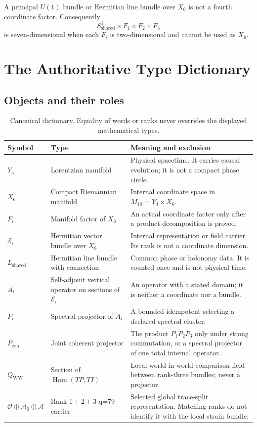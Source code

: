 \documentclass[11pt]{article}
\newcommand{\Ebundle}{\mathcal E}
\newcommand{\Lshared}{L_{\mathrm{shared}}}
\newcommand{\Pcoh}{P_{\mathrm{coh}}}
\newcommand{\Atrace}{\mathcal A_0}
\newcommand{\Acover}{\mathcal A}
\newcommand{\WW}{Q_{\mathrm{WW}}}
\newcommand{\Hom}{\operatorname{Hom}}
\begin{document}
A principal $U(1)$ bundle or Hermitian line bundle over $X_6$ is not a fourth
coordinate factor.  Consequently
\[
 S^1_{\mathrm{shared}}\times F_1\times F_2\times F_3
\]
is seven-dimensional when each $F_i$ is two-dimensional and cannot be used
as $X_6$.

\section{The Authoritative Type Dictionary}

\subsection{Objects and their roles}

\begin{table}[ht]
\centering
\small
\renewcommand{\arraystretch}{1.22}
\begin{tabularx}{\textwidth}{@{}P{0.15\textwidth}P{0.28\textwidth}Y@{}}
\hline
Symbol & Type & Meaning and exclusion \\
\hline
$Y_4$ &
Lorentzian manifold &
Physical spacetime.  It carries causal evolution; it is not a compact phase
circle. \\
$X_6$ &
Compact Riemannian manifold &
Internal coordinate space in $M_{10}=Y_4\times X_6$. \\
$F_i$ &
Manifold factor of $X_6$ &
An actual coordinate factor only after a product decomposition is proved. \\
$\Ebundle_i$ &
Hermitian vector bundle over $X_6$ &
Internal representation or field carrier.  Its rank is not a coordinate
dimension. \\
$\Lshared$ &
Hermitian line bundle with connection &
Common phase or holonomy data.  It is counted once and is not physical time. \\
$A_i$ &
Self-adjoint vertical operator on sections of $\Ebundle_i$ &
An operator with a stated domain; it is neither a coordinate nor a bundle. \\
$P_i$ &
Spectral projector of $A_i$ &
A bounded idempotent selecting a declared spectral cluster. \\
$\Pcoh$ &
Joint coherent projector &
The product $P_1P_2P_3$ only under strong commutation, or a spectral
projector of one total internal operator. \\
$\WW$ &
Section of $\Hom(TP,TI)$ &
Local world-in-world comparison field between rank-three bundles; never a
projector. \\
$\mathcal O\oplus\Atrace\oplus\Acover$ &
Rank $1+2+3$ q=79 carrier &
Selected global trace-split representation.  Matching ranks do not identify
it with the local strain bundle. \\
\hline
\end{tabularx}
\caption{Canonical dictionary.  Equality of words or ranks never overrides
the displayed mathematical types.}
\label{tab:dictionary}
\end{table}
\end{document}
